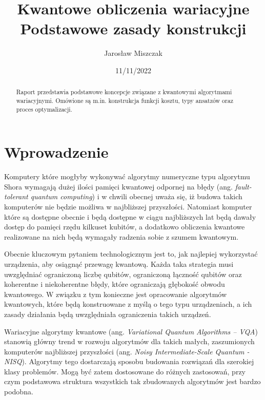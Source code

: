 \documentclass[a4paper,11pt]{article}
\newcommand{\ang}[1]{(ang. \emph{#1})}
\begin{document}
\title{Kwantowe obliczenia wariacyjne\\ {\normalsize Podstawowe zasady konstrukcji}}

\author{Jarosław Miszczak}
\date{11/11/2022}

\maketitle

\begin{abstract}
Raport przedstawia podstawowe koncepcje związane z kwantowymi algorytmami wariacyjnymi. Omówione są m.in. konstrukcja funkcji kosztu, typy ansatzów oraz proces optymalizacji.
\end{abstract}


\hypertarget{wprowadzenie}{%
\section{Wprowadzenie}\label{wprowadzenie}}

Komputery które mogłyby wykonywać algorytmy numeryczne typu algorytmu Shora wymagają dużej ilości pamięci kwantowej odpornej na błędy \ang{fault-tolerant quantum computing} i w chwili obecnej uważa się, iż budowa takich komputerów nie będzie możliwa w najbliższej przyszłości. Natomiast komputer które są dostępne obecnie i będą dostępne w ciągu najbliższych lat będą dawały dostęp do pamięci rzędu kilkuset kubitów, a dodatkowo obliczenia kwantowe realizowane na nich będą wymagały radzenia sobie z szumem kwantowym. 
 
Obecnie kluczowym pytaniem technologicznym jest to, jak najlepiej wykorzystać  urządzenia, aby osiągnąć przewagę kwantową. Każda taka strategia musi uwzględniać ograniczoną liczbę qubitów, ograniczoną łączność qubitów oraz koherentne i niekoherentne błędy, które ograniczają głębokość obwodu kwantowego. W związku z tym konieczne jest opracowanie algorytmów kwantowych, które będą konstruowane z myślą o tego typu urządzeniach, a ich zasady działania będą uwzględniała ograniczenia takich urządzeń.
 
Wariacyjne algorytmy kwantowe \ang{Variational Quantum Algorithms -- VQA} stanowią główny trend w rozwoju algorytmów dla takich małych, zaszumionych komputerów najbliższej przyszłości \ang{Noisy Intermediate-Scale Quantum - NISQ}. Algorytmy tego dostarczają sposobu budowania rozwiązań dla szerokiej klasy problemów. Mogą być zatem dostosowane do różnych zastosowań, przy czym podstawowa struktura wszystkich tak zbudowanych algorytmów jest bardzo podobna.
\end{document}
